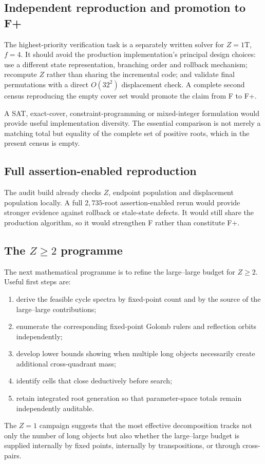 \documentclass[11pt,a4paper]{article}
\theoremstyle{definition}\newtheorem{definition}[theorem]{Definition}\newtheorem{remark}[theorem]{Remark}
\begin{document}
\subsection{Independent reproduction and promotion to F+}
The highest-priority verification task is a separately written solver for $Z=1\mathrm T$, $f=4$.  It should avoid the production implementation's principal design choices: use a different state representation, branching order and rollback mechanism; recompute $Z$ rather than sharing the incremental code; and validate final permutations with a direct $O(32^2)$ displacement check.  A complete second census reproducing the empty cover set would promote the claim from F to F+.

A SAT, exact-cover, constraint-programming or mixed-integer formulation would provide useful implementation diversity.  The essential comparison is not merely a matching total but equality of the complete set of positive roots, which in the present census is empty.

\subsection{Full assertion-enabled reproduction}
The audit build already checks $Z$, endpoint population and displacement population locally.  A full $2{,}735$-root assertion-enabled rerun would provide stronger evidence against rollback or stale-state defects.  It would still share the production algorithm, so it would strengthen F rather than constitute F+.

\subsection{The $Z\ge2$ programme}
The next mathematical programme is to refine the large--large budget for $Z\ge2$.  Useful first steps are:
\begin{enumerate}
\item derive the feasible cycle spectra by fixed-point count and by the source of the large--large contributions;
\item enumerate the corresponding fixed-point Golomb rulers and reflection orbits independently;
\item develop lower bounds showing when multiple long objects necessarily create additional cross-quadrant mass;
\item identify cells that close deductively before search;
\item retain integrated root generation so that parameter-space totals remain independently auditable.
\end{enumerate}
The $Z=1$ campaign suggests that the most effective decomposition tracks not only the number of long objects but also whether the large--large budget is supplied internally by fixed points, internally by transpositions, or through cross-pairs.
\end{document}
